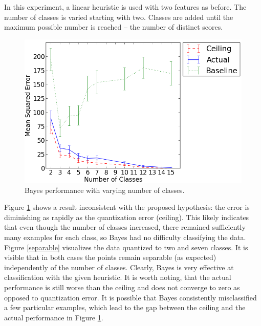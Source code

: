 \documentclass[12pt,a4paper,notitlepage,twoside]{scrbook}
\begin{document}
In this experiment, a linear heuristic is used with two features as before. The number of
classes is varied starting with two. Classes are added until the maximum possible
number is reached -- the number of distinct scores. 

\begin{figure}[h!]
	\centering
  \includegraphics[width=0.8\linewidth]{figs/quants.png}
  \caption{Bayes performance with varying number of classes.\label{quants}}
\end{figure}
Figure \ref{quants} shows a result inconsistent with the proposed hypothesis: the error is
diminishing as rapidly as the quantization error (ceiling). This likely indicates that
even though the number of classes increased, there remained sufficiently many examples for
each class, so Bayes had no difficulty classifying the data. Figure
\ref{separable} visualizes the data quantized to two and seven classes. It is visible that
in both cases the points remain separable (as expected) independently of the number
of classes. Clearly, Bayes is very effective at classification with the given heuristic.
It is worth noting, that the actual performance is still worse than the ceiling and does
not converge to zero as opposed to quantization error. It is possible that Bayes
consistently misclassified a few particular examples, which lead to the gap between the
ceiling and the actual performance in Figure \ref{quants}.
\end{document}
